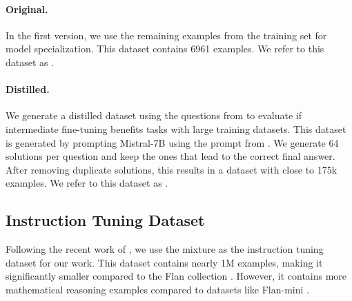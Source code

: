 \paragraph{Original.}
In the first version, we use the remaining examples from the training set for model specialization. This dataset contains 6961 examples. We refer to this dataset as \gsmo{}.

\paragraph{Distilled.}
We generate a distilled dataset using the questions from \gsmo{} to evaluate if intermediate fine-tuning benefits tasks with large training datasets. This dataset is generated by prompting Mistral-7B \citep{jiang2023mistral} using the prompt from \citet{wei2022chain}. We generate 64 solutions per question and keep the ones that lead to the correct final answer. After removing duplicate solutions, this results in a dataset with close to 175k examples. We refer to this dataset as \gsmd{}.

\subsection{Instruction Tuning Dataset}
Following the recent work of \citet{lambert2024t}, we use the \tulu{} mixture as the instruction tuning dataset for our work. This dataset contains nearly 1M examples, making it significantly smaller compared to the Flan collection \citep{longpre2023flan}. However, it contains more mathematical reasoning examples compared to datasets like Flan-mini \citep{ghosal2023flacuna}. 


